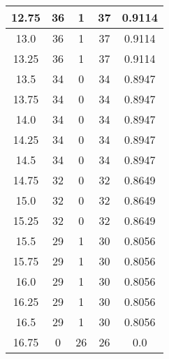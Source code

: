 \documentclass[letterpaper, 12pt]{article}
\begin{document}
\begin{longtable}{|c|c|c|c|c|}
\hline
12.75 & 36 & 1 & 37 & 0.9114 \\
\hline
13.0 & 36 & 1 & 37 & 0.9114 \\
\hline
13.25 & 36 & 1 & 37 & 0.9114 \\
\hline
13.5 & 34 & 0 & 34 & 0.8947 \\
\hline
13.75 & 34 & 0 & 34 & 0.8947 \\
\hline
14.0 & 34 & 0 & 34 & 0.8947 \\
\hline
14.25 & 34 & 0 & 34 & 0.8947 \\
\hline
14.5 & 34 & 0 & 34 & 0.8947 \\
\hline
14.75 & 32 & 0 & 32 & 0.8649 \\
\hline
15.0 & 32 & 0 & 32 & 0.8649 \\
\hline
15.25 & 32 & 0 & 32 & 0.8649 \\
\hline
15.5 & 29 & 1 & 30 & 0.8056 \\
\hline
15.75 & 29 & 1 & 30 & 0.8056 \\
\hline
16.0 & 29 & 1 & 30 & 0.8056 \\
\hline
16.25 & 29 & 1 & 30 & 0.8056 \\
\hline
16.5 & 29 & 1 & 30 & 0.8056 \\
\hline
16.75 & 0 & 26 & 26 & 0.0 \\
\hline
\end{longtable}
\end{document}
